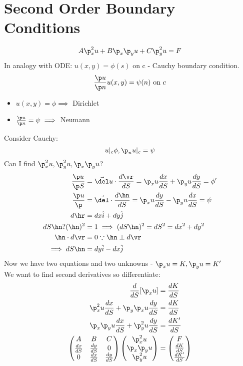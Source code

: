 \documentclass[Maths.tex]{subfiles}
\begin{document}
\section{Second Order Boundary Conditions}
\begin{equation}
A\p_x^2u + B\p_x\p_yu + C\p_y^2u = F
\end{equation}
In analogy with ODE: $u(x,y) = \phi(s)$ on c - Cauchy boundary condition.
\begin{equation}
	\frac{\p u}{\p n}u(x,y) = \psi(n) \text{ on }c
\end{equation}
\begin{itemize}
	\item $u(x,y) = \phi \implies$ Dirichlet
	\item $\frac{\p u}{\p n} = \psi \implies$ Neumann
\end{itemize}
Consider Cauchy:
\begin{equation}
	u|_c\phi, \p_nu|_c = \psi
\end{equation}
Can I find $\p_x^2u, \p_y^2u, \p_x\p_yu$?
\begin{align}
	\frac{\p u}{\p S} &= \vec{\del}u\cdot\frac{d\vr}{dS} = \p_xu\frac{dx}{dS} + \p_yu \frac{dy}{dS} = \phi' \\
	\frac{\p u}{\p } &= \vec{\del}\cdot\frac{d\hn}{dS} = \p_xu\frac{dy}{dS} - \p_yu\frac{dx}{dS} = \psi \\
	d\hr &= dx\hat{i} + dy\hat{j} \\
	dS\hn ? (\hn)^2 &= 1 \implies (dS\hn)^2 = dS^2 = dx^2 + dy^2 \\
	\hn\cdot d\vr &= 0 \because \hn \perp d\vr \\
	\implies dS\hn &= dy\hat{i} - dx\hat{j}
\end{align}
Now we have two equations and two unknowns - $\p_xu = K, \p_yu = K'$ \\
We want to find second derivatives so differentiate:
\begin{align}
	\frac{d}{dS}[\p_xu] &= \frac{dK}{dS} \\
	\p_x^2u\frac{dx}{dS} + \p_y\p_xu\frac{dy}{dS} &= \frac{dK}{dS} \\
	\p_x\p_yu\frac{dx}{dS} + \p_y^2u\frac{dy}{dS} &= \frac{dK'}{dS} \\
	\begin{pmatrix} A & B & C \\ \frac{dx}{dS} & \frac{dy}{dS} & 0 \\
		0 & \frac{dx}{dS} & \frac{dy}{dS} \end{pmatrix}\begin{pmatrix} \p_x^2u \\ \p_x\p_yu \\ \p_y^2u \end{pmatrix} &= \begin{pmatrix} F \\ \frac{dK}{dS} \\ \frac{dK'}{dS} \end{pmatrix}
\end{align}
\end{document}
